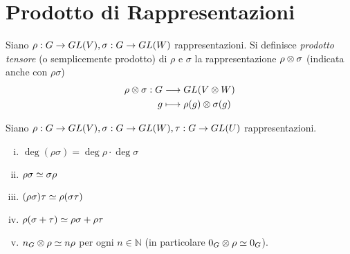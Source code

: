 \section{Prodotto di Rappresentazioni}

\begin{definition}
Siano $\rho:G\to GL(V),\allowbreak\sigma:G\to GL(W)$ rappresentazioni. Si definisce \emph{prodotto tensore} (o semplicemente prodotto) di $\rho$ e $\sigma$ la rappresentazione $\rho\otimes \sigma$ (indicata anche con $\rho\sigma$)
\begin{align*}
\rho\otimes\sigma:G&\longrightarrow GL(V\otimes W)\\
g&\longmapsto \rho(g)\otimes\sigma(g)
\end{align*}
\end{definition}

\begin{proposition}
Siano $\rho:G\to GL(V),\allowbreak\sigma:G\to GL(W),\allowbreak\tau:G\to GL(U)$ rappresentazioni.
\begin{enumerate}[(i)]
\item $\deg(\rho\sigma)=\deg\rho\cdot\deg\sigma$
\item $\rho\sigma\simeq\sigma\rho$
\item $(\rho\sigma)\tau\simeq\rho(\sigma\tau)$
\item $\rho(\sigma+\tau)\simeq\rho\sigma+\rho\tau$
\item $n_G\otimes\rho\simeq n\rho$ per ogni $n\in\mathbb{N}$ (in particolare $0_G\otimes\rho\simeq 0_G$).
\end{enumerate}
\end{proposition}
